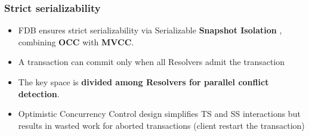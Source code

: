 \begin{frame}
	\frametitle{Strict serializability}
\begin{itemize}
  \item FDB ensures strict serializability via Serializable \textbf{Snapshot Isolation} , combining \textbf{OCC} with \textbf{MVCC}.
  \item A transaction can commit only when all Resolvers admit the transaction
  \item The key space is \textbf{divided among Resolvers for parallel conflict detection}.
  \item Optimistic Concurrency Control design simplifies TS and SS interactions but results in wasted work for aborted transactions (client restart the transaction)
\end{itemize}

 \end{frame}






